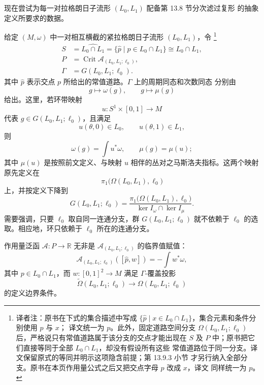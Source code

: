 \section{\termFloerChainModule{}}
\label{sec:floer-chain-modules}

现在尝试为每一对拉格朗日子流形 $(L_0,L_1)$ 配备第 13.8 节分次滤过\personFloer{}复形
的抽象定义所要求的数据。

给定 $(M,\omega)$ 中一对相互横截的紧拉格朗日子流形 $(L_0,L_1)$，令
\footnote{译者注：原书在下式的集合描述中写成
$\{\widehat p\mid x\in L_0\cap L_1\}$，集合元素和条件分别使用 $p$ 与 $x$；
译文统一为 $p$。此外，固定道路空间分支
$\Omega(L_0,L_1;\ell_0)$ 后，严格说只有常值道路属于该分支的交点才能出现在
$S$ 及 $P$ 中；原书把它们直接等同于全部 $L_0\cap L_1$，却没有假设所有这些
常值道路位于同一分支。译文保留原式的等同并明示这项隐含前提；第 13.9.3 小节
才另行纳入全部分支。原书在本页作用量公式之后又把交点字母 $p$ 改成 $x$，译文
同样统一为 $p$。}
\begin{equation}
  \begin{aligned}
    S&=\widehat{L_0\cap L_1}
      =\{\widehat p\mid p\in L_0\cap L_1\}
      \cong L_0\cap L_1,\\
    P&=\operatorname{Crit}\mathcal A_{(L_0,L_1;\ell_0)},\\
    \Gamma&=G(L_0,L_1;\ell_0).
  \end{aligned}
\label{eq:concrete-floer-novikov-data}
\end{equation}
其中 $\widehat p$ 表示交点 $p$ 所给出的常值道路。$\Gamma$ 上的周期同态和次数同态
分别由
\[
  g\longmapsto\omega(g),
  \qquad
  g\longmapsto\mu(g)
\]
给出。这里，若环带映射
\[
  u:S^1\times[0,1]\longrightarrow M
\]
代表 $g\in G(L_0,L_1;\ell_0)$，且满足
\[
  u(\theta,0)\in L_0,
  \qquad
  u(\theta,1)\in L_1,
\]
则
\[
  \omega(g)=\int u^*\omega,
  \qquad
  \mu(g)=\mu(u);
\]
其中 $\mu(u)$ 是按照前文定义、与映射 $u$ 相伴的丛对之马斯洛夫指标。这两个映射
原先定义在
\[
  \pi_1\bigl(\Omega(L_0,L_1),\ell_0\bigr)
\]
上，并按定义下降到
\[
  G(L_0,L_1;\ell_0)
  =
  \frac{\pi_1\bigl(\Omega(L_0,L_1),\ell_0\bigr)}
       {\ker I_\omega\cap\ker I_\mu}.
\]
需要强调，只要 $\ell_0$ 取自同一连通分支，群 $G(L_0,L_1;\ell_0)$ 就不依赖于
$\ell_0$ 的选取。相应地，\personNovikov{}环只依赖于 $\ell_0$ 所在的连通分支。

作用量泛函 $\mathcal A:P\to\mathbb R$ 无非是
$\mathcal A_{(L_0,L_1;\ell_0)}$ 的临界值赋值：
\[
  \mathcal A_{(L_0,L_1;\ell_0)}([\widehat p,w])
  =-\int w^*\omega,
\]
其中 $p\in L_0\cap L_1$，而 $w:[0,1]^2\to M$ 满足 $\Gamma$-覆盖投影
\[
  \widetilde\Omega(L_0,L_1;\ell_0)
  \longrightarrow\Omega(L_0,L_1;\ell_0)
\]
的定义边界条件。

